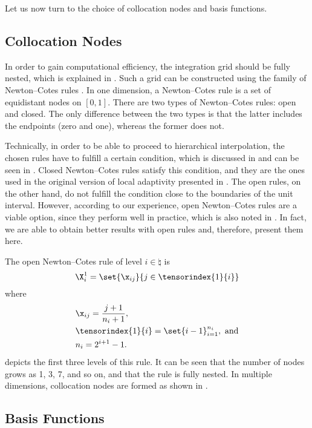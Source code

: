 Let us now turn to the choice of collocation nodes and basis functions.

\subsection{Collocation Nodes}

In order to gain computational efficiency, the integration grid should be fully
nested, which is explained in . Such a grid can
be constructed using the family of Newton--Cotes rules \cite{ma2009}. In one
dimension, a Newton--Cotes rule is a set of equidistant nodes on $[0, 1]$. There
are two types of Newton--Cotes rules: open and closed. The only difference
between the two types is that the latter includes the endpoints (zero and one),
whereas the former does not.

Technically, in order to be able to proceed to hierarchical interpolation, the
chosen rules have to fulfill a certain condition, which is discussed in
 and can be seen in
. Closed Newton--Cotes rules satisfy this
condition, and they are the ones used in the original version of local
adaptivity presented in \cite{ma2009}. The open rules, on the other hand, do not
fulfill the condition close to the boundaries of the unit interval. However,
according to our experience, open Newton--Cotes rules are a viable option, since
they perform well in practice, which is also noted in \cite{klimke2006}. In
fact, we are able to obtain better results with open rules and, therefore,
present them here.

The open Newton--Cotes rule of level $i \in \natural$ is
\[
  \X^1_i = \set{\x_{ij}}{j \in \tensorindex{1}{i}}
\]
where
\begin{align*}
  & \x_{ij} = \frac{j + 1}{n_i + 1}, \\
  & \tensorindex{1}{i} = \set{i - 1}_{i = 1}^{n_i}, \text{ and} \\
  & n_i = 2^{i + 1} - 1.
\end{align*}
 depicts the first three levels of this rule. It can be seen
that the number of nodes grows as 1, 3, 7, and so on, and that the rule is fully
nested. In multiple dimensions, collocation nodes are formed as shown in
.

\subsection{Basis Functions}

